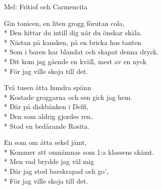 \begin{SongText}[Rosita]
    \begin{SongInfo}
        Mel: Fritiof och Carmencita
    \end{SongInfo}
    \begin{SongVerse}
        Gin tonicen, en liten grogg förutan cola,\\*%
        Den hittar du intill dig när du önskar skåla.\\*%
        Nästan på kansken, på en bricka hos tanten\\*%
        Som i baren har blandat och skapat denna dryck.\\*%
        Dit kom jag gående en kväll, mest av en nyck\\*%
        För jag ville skoja till det.
    \end{SongVerse}
    \begin{SongVerse}
        Två tusen åtta hundra spänn\\*%
        Kostade groggarna och sen gick jag hem.\\*%
        Där på diskbänken i Delfi,\\*%
        Den som aldrig gjordes ren,\\*%
        Stod en bedårande Rosita.
    \end{SongVerse}
    \begin{SongVerse}
        En som om åtta sekel jämt,\\*%
        Kommer att omnämnas som 1:a klassens skämt.\\*%
        Men vad brydde jag väl mig\\*%
        Där jag stod barskrapad och go’,\\*%
        För jag ville skoja till det.
    \end{SongVerse}
\end{SongText}

